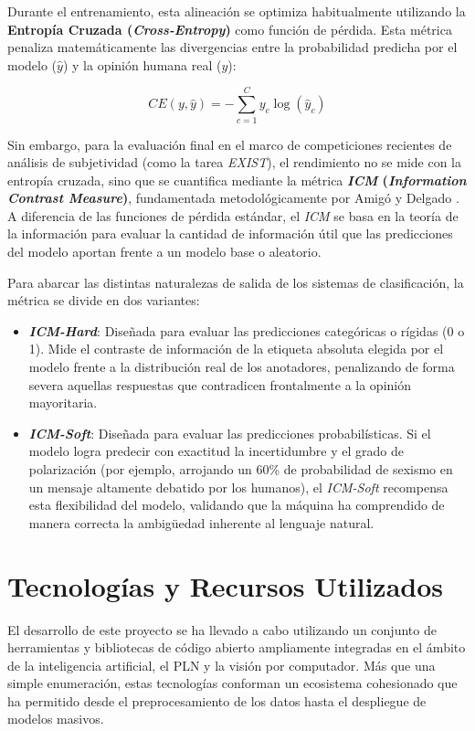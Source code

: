Durante el entrenamiento, esta alineación se optimiza habitualmente utilizando la \textbf{Entropía Cruzada (\textit{Cross-Entropy})} como función de pérdida. Esta métrica penaliza matemáticamente las divergencias entre la probabilidad predicha por el modelo ($\hat{y}$) y la opinión humana real ($y$):

\begin{equation}
    CE(y, \hat{y}) = -\sum_{c=1}^{C} y_c \log(\hat{y}_c)
    \label{eq:crossEntropy}
\end{equation}

Sin embargo, para la evaluación final en el marco de competiciones recientes de análisis de subjetividad (como la tarea \textit{EXIST}), el rendimiento no se mide con la entropía cruzada, sino que se cuantifica mediante la métrica \textbf{\textit{ICM} (\textit{Information Contrast Measure})}, fundamentada metodológicamente por Amigó y Delgado \cite{amigo2022evaluating}. A diferencia de las funciones de pérdida estándar, el \textit{ICM} se basa en la teoría de la información para evaluar la cantidad de información útil que las predicciones del modelo aportan frente a un modelo base o aleatorio.

Para abarcar las distintas naturalezas de salida de los sistemas de clasificación, la métrica se divide en dos variantes:
\begin{itemize}
    \item \textbf{\textit{ICM-Hard}}: Diseñada para evaluar las predicciones categóricas o rígidas (0 o 1). Mide el contraste de información de la etiqueta absoluta elegida por el modelo frente a la distribución real de los anotadores, penalizando de forma severa aquellas respuestas que contradicen frontalmente a la opinión mayoritaria.
    \item \textbf{\textit{ICM-Soft}}: Diseñada para evaluar las predicciones probabilísticas. Si el modelo logra predecir con exactitud la incertidumbre y el grado de polarización (por ejemplo, arrojando un 60\% de probabilidad de sexismo en un mensaje altamente debatido por los humanos), el \textit{ICM-Soft} recompensa esta flexibilidad del modelo, validando que la máquina ha comprendido de manera correcta la ambigüedad inherente al lenguaje natural.
\end{itemize}

\section{Tecnologías y Recursos Utilizados}
\label{sec:Tecnologias}
El desarrollo de este proyecto se ha llevado a cabo utilizando un conjunto de herramientas y bibliotecas de código abierto ampliamente integradas en el ámbito de la inteligencia artificial, el PLN y la visión por computador. Más que una simple enumeración, estas tecnologías conforman un ecosistema cohesionado que ha permitido desde el preprocesamiento de los datos hasta el despliegue de modelos masivos.

